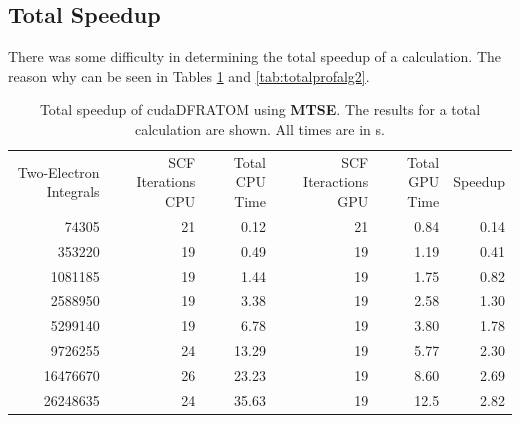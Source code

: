 \subsection{Total Speedup}
There was some difficulty in determining the total speedup of a calculation. The reason why can be seen in Tables \ref{tab:totalprofalg1} and \ref{tab:totalprofalg2}.

\begin{table}[h!]
\begin{center}
\caption[Total speedup of alg1]{Total speedup of cudaDFRATOM using \textbf{MTSE}. The results for a total calculation are shown. All times are in s.}
\label{tab:totalprofalg1}
\begin{tabular}{rrrrrr}
\toprule
	\multirow{2}{3cm}{Two-Electron Integrals}	&	\multirow{2}{3cm}{SCF Iterations CPU}	&	\multirow{2}{2cm}{Total CPU Time}		&	\multirow{2}{3cm}{SCF Iteractions GPU}		&	\multirow{2}{2cm}{Total GPU Time}		&	\multirow{2}{*}{Speedup}	\\
	\\
\midrule
	74305	&	21	&	0.12		&	21	&	0.84	&	0.14	\\
	353220	&	19	&	0.49		&	19	&	1.19	&	0.41	\\
	1081185	&	19	&	1.44		&	19	&	1.75	&	0.82	\\
	2588950	&	19	&	3.38		&	19	&	2.58	&	1.30	\\
	5299140	&	19	&	6.78		&	19	&	3.80	&	1.78	\\
	9726255	&	24	&	13.29	&	19	&	5.77	&	2.30	\\
	16476670	&	26	&	23.23	&	19	&	8.60	&	2.69	\\
	26248635	&	24	&	35.63	&	19	&	12.5	&	2.82	\\
\bottomrule
\end{tabular}
\end{center}
\end{table}

